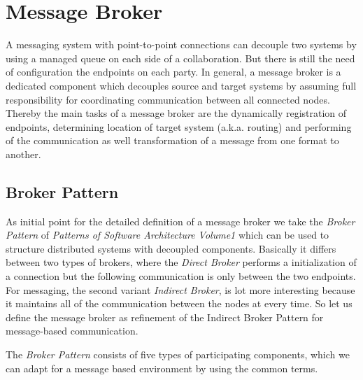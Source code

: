 \section{Message Broker}
\label{intro-messaging-broker}
A messaging system with point-to-point connections can decouple two systems
by using a managed queue on each side of a collaboration. But there is
still the need of configuration the endpoints on each party. In general, a
message broker is a dedicated component which decouples source and
target systems by assuming full responsibility for coordinating communication between
all connected nodes. Thereby the main tasks of a message broker are the
dynamically registration of endpoints, determining location of target system
(a.k.a. routing) and performing of the communication as well transformation of a
message from one format to another.\cite{MSDNIntegration} \\

\subsection{Broker Pattern}
As initial point for the detailed definition of a message broker we take the
\textit{Broker Pattern} of  \textit{Patterns of Software Architecture Volume1}
which can be used to structure distributed systems with decoupled components.
Basically it differs between two types of brokers, where the \textit{Direct
Broker} performs a initialization of a connection but the following communication
is only between the two endpoints. For messaging, the second variant
\textit{Indirect Broker}, is lot more interesting because it maintains all of
the communication between the nodes at every time. So let us define the message
broker as refinement of the Indirect Broker Pattern for message-based
communication.\cite{POSA1} 

The \textit{Broker Pattern} consists of five types of participating components,
which we can adapt for a message based environment by using the common terms.

